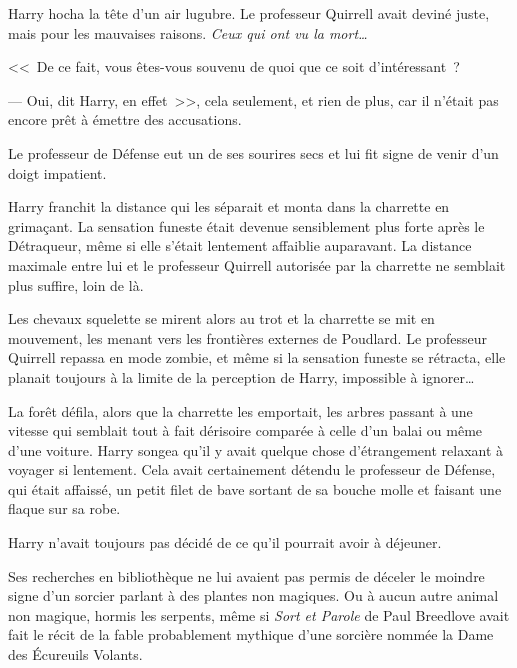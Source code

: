 Harry hocha la tête d'un air lugubre. Le professeur Quirrell avait deviné juste, mais pour les mauvaises raisons. \emph{Ceux qui ont vu la mort…}

<<~De ce fait, vous êtes-vous souvenu de quoi que ce soit d'intéressant~?

--- Oui, dit Harry, en effet~>>, cela seulement, et rien de plus, car il n'était pas encore prêt à émettre des accusations.

Le professeur de Défense eut un de ses sourires secs et lui fit signe de venir d'un doigt impatient.

Harry franchit la distance qui les séparait et monta dans la charrette en grimaçant. La sensation funeste était devenue sensiblement plus forte après le Détraqueur, même si elle s'était lentement affaiblie auparavant. La distance maximale entre lui et le professeur Quirrell autorisée par la charrette ne semblait plus suffire, loin de là.

Les chevaux squelette se mirent alors au trot et la charrette se mit en mouvement, les menant vers les frontières externes de Poudlard. Le professeur Quirrell repassa en mode zombie, et même si la sensation funeste se rétracta, elle planait toujours à la limite de la perception de Harry, impossible à ignorer…

La forêt défila, alors que la charrette les emportait, les arbres passant à une vitesse qui semblait tout à fait dérisoire comparée à celle d'un balai ou même d'une voiture. Harry songea qu'il y avait quelque chose d'étrangement relaxant à voyager si lentement. Cela avait certainement détendu le professeur de Défense, qui était affaissé, un petit filet de bave sortant de sa bouche molle et faisant une flaque sur sa robe.

Harry n'avait toujours pas décidé de ce qu'il pourrait avoir à déjeuner.

Ses recherches en bibliothèque ne lui avaient pas permis de déceler le moindre signe d'un sorcier parlant à des plantes non magiques. Ou à aucun autre animal non magique, hormis les serpents, même si \emph{Sort et Parole} de Paul Breedlove avait fait le récit de la fable probablement mythique d'une sorcière nommée la Dame des Écureuils Volants.

